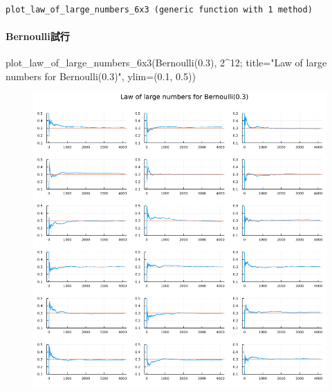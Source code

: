 \documentclass[
  letterpaper,
  DIV=11,
  numbers=noendperiod]{scrartcl}
\let\oldparagraph\paragraph
\renewcommand{\paragraph}[1]{\oldparagraph{#1}\mbox{}}
\newenvironment{Shaded}{\begin{snugshade}}{\end{snugshade}}
\newcommand{\FloatTok}[1]{\textcolor[rgb]{0.68,0.00,0.00}{#1}}
\newcommand{\FunctionTok}[1]{\textcolor[rgb]{0.28,0.35,0.67}{#1}}
\newcommand{\NormalTok}[1]{\textcolor[rgb]{0.00,0.23,0.31}{#1}}
\newcommand{\OperatorTok}[1]{\textcolor[rgb]{0.37,0.37,0.37}{#1}}
\newcommand{\StringTok}[1]{\textcolor[rgb]{0.13,0.47,0.30}{#1}}
\begin{document}
\begin{verbatim}
plot_law_of_large_numbers_6x3 (generic function with 1 method)
\end{verbatim}

\hypertarget{bernoulliux8a66ux884c}{%
\paragraph{Bernoulli試行}\label{bernoulliux8a66ux884c}}

\begin{Shaded}
\begin{Highlighting}[]
\FunctionTok{plot\_law\_of\_large\_numbers\_6x3}\NormalTok{(}\FunctionTok{Bernoulli}\NormalTok{(}\FloatTok{0.3}\NormalTok{), }\FloatTok{2}\OperatorTok{\^{}}\FloatTok{12}\NormalTok{;}
\NormalTok{    title}\OperatorTok{=}\StringTok{"Law of large numbers for Bernoulli(0.3)"}\NormalTok{, ylim}\OperatorTok{=}\NormalTok{(}\FloatTok{0.1}\NormalTok{, }\FloatTok{0.5}\NormalTok{))}
\end{Highlighting}
\end{Shaded}

\begin{figure}[H]

{\centering \includegraphics{05 Central limit theorem_files/figure-pdf/cell-13-output-1.png}

}

\end{figure}
\end{document}

